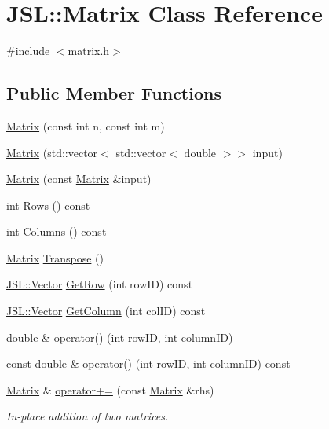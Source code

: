 \hypertarget{classJSL_1_1Matrix}{}\section{J\+SL\+:\+:Matrix Class Reference}
\label{classJSL_1_1Matrix}


{\ttfamily \#include $<$matrix.\+h$>$}

\subsection*{Public Member Functions}
\begin{DoxyCompactItemize}
\item 
\hyperlink{classJSL_1_1Matrix_a90ddd1113043b8959b0943be24f9ad9f}{Matrix} (const int n, const int m)
\item 
\hyperlink{classJSL_1_1Matrix_ab6bc06d3dcc5f25f2083d3a3946378df}{Matrix} (std\+::vector$<$ std\+::vector$<$ double $>$$>$ input)
\item 
\hyperlink{classJSL_1_1Matrix_ae6198f4beabaff7700265fffeb490ed7}{Matrix} (const \hyperlink{classJSL_1_1Matrix}{Matrix} \&input)
\item 
int \hyperlink{classJSL_1_1Matrix_af784cad8dcbb502c06be62e2e328ef6c}{Rows} () const
\item 
int \hyperlink{classJSL_1_1Matrix_a8aba7f9803b553df2aeae68aba3445f5}{Columns} () const
\item 
\hyperlink{classJSL_1_1Matrix}{Matrix} \hyperlink{classJSL_1_1Matrix_a984691eac759ff0e8f98252d07be7e1a}{Transpose} ()
\item 
\hyperlink{classJSL_1_1Vector}{J\+S\+L\+::\+Vector} \hyperlink{classJSL_1_1Matrix_aa8bae8650234f5e5569277563d68f22d}{Get\+Row} (int row\+ID) const
\item 
\hyperlink{classJSL_1_1Vector}{J\+S\+L\+::\+Vector} \hyperlink{classJSL_1_1Matrix_a11ea58ca43e028123f628966eb4834a0}{Get\+Column} (int col\+ID) const
\item 
double \& \hyperlink{classJSL_1_1Matrix_a23d8192e8a00d213693b82b3caeb0ceb}{operator()} (int row\+ID, int column\+ID)
\item 
const double \& \hyperlink{classJSL_1_1Matrix_ab5dd212faa491611c31288644db66a60}{operator()} (int row\+ID, int column\+ID) const
\item 
\hyperlink{classJSL_1_1Matrix}{Matrix} \& \hyperlink{classJSL_1_1Matrix_ae317e4316d0d40ce919fb22a9f4824a7}{operator+=} (const \hyperlink{classJSL_1_1Matrix}{Matrix} \&rhs)
\begin{DoxyCompactList}\small\item\em In-\/place addition of two matrices. \end{DoxyCompactList}\item 
$$
\end{DoxyCompactItemize}
